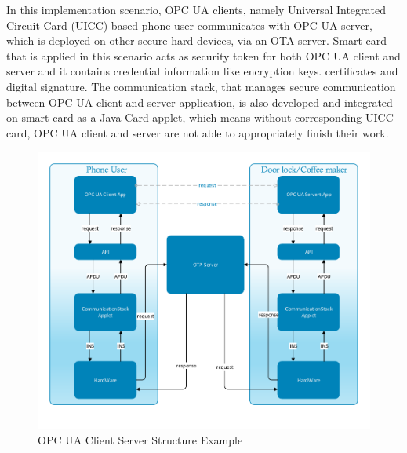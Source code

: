 In this implementation scenario, OPC UA clients, namely Universal Integrated Circuit Card (UICC)  based phone user communicates with OPC UA server, which is deployed on other secure hard devices, via an OTA server.   Smart card that is applied in this scenario acts as security token for both OPC UA client and server and it contains credential information like encryption keys. certificates and digital signature. The communication stack, that manages secure  communication between OPC UA client and server application, is also developed and integrated on smart card as a Java Card applet, which means without corresponding UICC card, OPC UA client and server are not able to appropriately finish their work.


 \begin{figure}[ht]

	\centering
	\includegraphics[width=1.1\textwidth]{csoverview}
		\caption{OPC UA Client Server Structure Example}
	\label{fig:softwareStructure}
\end{figure}


